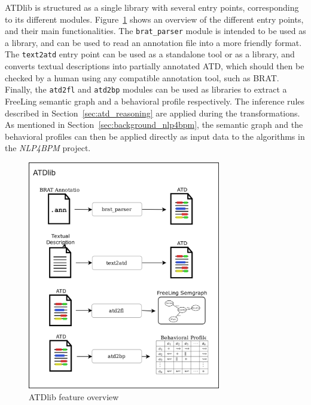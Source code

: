 ATDlib is structured as a single library with several entry points,
corresponding to its different modules. Figure~\ref{fig:atdlib_architecture}
shows an overview of the different entry points, and their main functionalities.
The \texttt{brat\_parser} module is intended to be used as a library, and can be
used to read an annotation file into a more friendly format. The \texttt{text2atd}
entry point can be used as a standalone tool or as a library, and converts
textual descriptions into partially annotated ATD, which should then be checked
by a human using any compatible annotation tool, such as BRAT. Finally, the
\texttt{atd2fl} and \texttt{atd2bp} modules can be used as libraries to extract
a FreeLing semantic graph and a behavioral profile respectively. The inference
rules described in Section~\ref{sec:atd_reasoning} are applied during the
transformations. As mentioned in Section~\ref{sec:background_nlp4bpm}, the
semantic graph and the behavioral profiles can then be applied directly as input
data to the algorithms in the \emph{NLP4BPM} project.

\begin{figure}[htb]
  \centering
  \includegraphics[width=0.75\textwidth]{figures/atdlib_arch}
  \caption{ATDlib feature overview}
  \label{fig:atdlib_architecture}
\end{figure}


